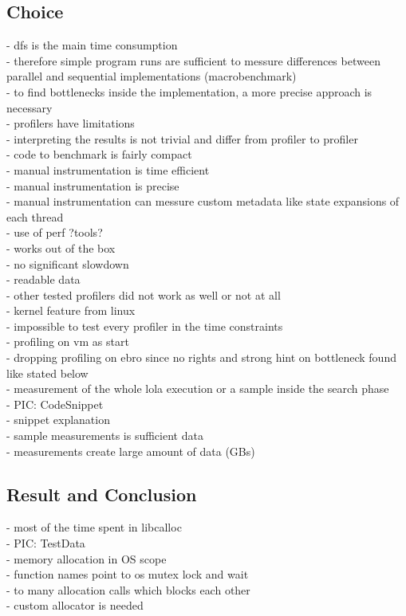 \subsection{Choice}
- dfs is the main time consumption\\
- therefore simple program runs are sufficient to messure differences between parallel and sequential implementations (macrobenchmark)\\
- to find bottlenecks inside the implementation, a more precise approach is necessary\\
- profilers have limitations\\
- interpreting the results is not trivial and differ from profiler to profiler\\
- code to benchmark is fairly compact\\
- manual instrumentation is time efficient\\
- manual instrumentation is precise\\
- manual instrumentation can messure custom metadata like state expansions of each thread\\


- use of perf ?tools?\\%
- works out of the box\\%
- no significant slowdown\\
- readable data\\
- other tested profilers did not work as well or not at all\\
- kernel feature from linux\\
- impossible to test every profiler in the time constraints\\
- profiling on vm as start\\%
- dropping profiling on ebro since no rights and strong hint on bottleneck found like stated below\\%
- measurement of the whole lola execution or a sample inside the search phase\\%
- PIC: CodeSnippet\\
- snippet explanation\\
- sample measurements is sufficient data\\ %
- measurements create large amount of data (GBs)\\

\subsection{Result and Conclusion}
- most of the time spent in libcalloc\\
- PIC: TestData\\
- memory allocation in OS scope\\
- function names point to os mutex lock and wait\\
- to many allocation calls which blocks each other\\
- custom allocator is needed\\

